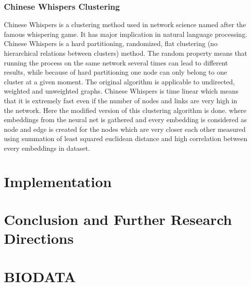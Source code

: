 \documentclass[a4paper,12pt, twoside]{NITKReport}
\begin{document}
\subsection{Chinese Whispers Clustering}
\par Chinese Whispers is a clustering method used in network science named after the famous whispering game. It has major implication in natural language processing. Chinese Whispers is a hard partitioning, randomized, flat clustering (no hierarchical relations between clusters) method. The random property means that running the process on the same network several times can lead to different results, while because of hard partitioning one node can only belong to one cluster at a given moment. The original algorithm is applicable to undirected, weighted and unweighted graphs. Chinese Whispers is time linear which means that it is extremely fast even if the number of nodes and links are very high in the network.\cite{biemann2006chinese} Here the modified version of this clustering algorithm is done. where embeddings from the neural net is gathered and every embedding is considered as node and edge is created for the nodes which are very closer each other measured using summation of least squared euclidean distance and high correlation between every embeddings in dataset.

\newpage
\chapter{Implementation}


\newpage
\chapter{Conclusion and Further Research Directions}
\label{conclusion}

	





\newpage
\pagestyle{plain}
\thispagestyle{empty}
\chapter*{\centering BIODATA}
\end{document}

